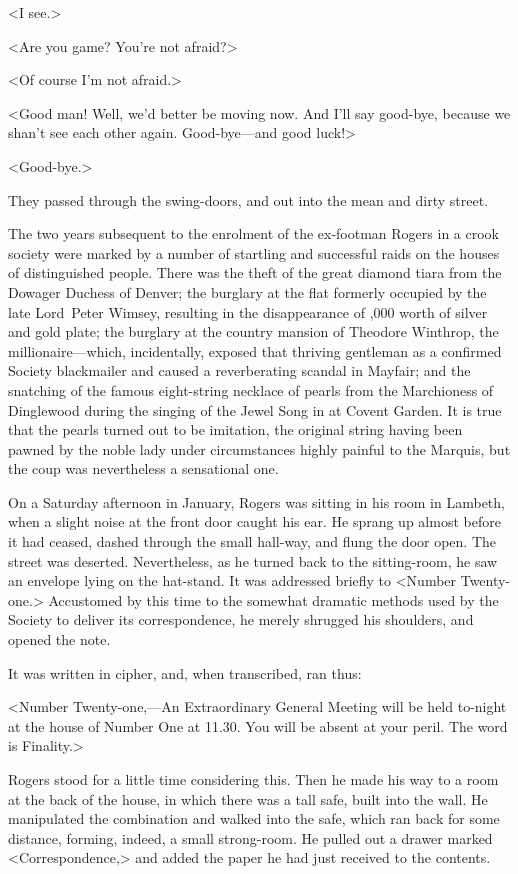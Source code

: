 <I see.>

<Are you game? You're not afraid?>

<Of course I'm not afraid.>

<Good man! Well, we'd better be moving now. And I'll say good-bye, because we shan't see each other again. Good-bye—and good luck!>

<Good-bye.>

They passed through the swing-doors, and out into the mean and dirty street.

The two years subsequent to the enrolment of the ex-footman Rogers in a crook society were marked by a number of startling and successful raids on the houses of distinguished people. There was the theft of the great diamond tiara from the Dowager Duchess of Denver; the burglary at the flat formerly occupied by the late Lord~Peter Wimsey, resulting in the disappearance of ,000 worth of silver and gold plate; the burglary at the country mansion of Theodore Winthrop, the millionaire—which, incidentally, exposed that thriving gentleman as a confirmed Society blackmailer and caused a reverberating scandal in Mayfair; and the snatching of the famous eight-string necklace of pearls from the Marchioness of Dinglewood during the singing of the Jewel Song in  at Covent Garden. It is true that the pearls turned out to be imitation, the original string having been pawned by the noble lady under circumstances highly painful to the Marquis, but the coup was nevertheless a sensational one.

On a Saturday afternoon in January, Rogers was sitting in his room in Lambeth, when a slight noise at the front door caught his ear. He sprang up almost before it had ceased, dashed through the small hall-way, and flung the door open. The street was deserted. Nevertheless, as he turned back to the sitting-room, he saw an envelope lying on the hat-stand. It was addressed briefly to <Number Twenty-one.> Accustomed by this time to the somewhat dramatic methods used by the Society to deliver its correspondence, he merely shrugged his shoulders, and opened the note.

It was written in cipher, and, when transcribed, ran thus:

<Number Twenty-one,—An Extraordinary General Meeting will be held to-night at the house of Number One at 11.30. You will be absent at your peril. The word is Finality.>

Rogers stood for a little time considering this. Then he made his way to a room at the back of the house, in which there was a tall safe, built into the wall. He manipulated the combination and walked into the safe, which ran back for some distance, forming, indeed, a small strong-room. He pulled out a drawer marked <Correspondence,> and added the paper he had just received to the contents.

